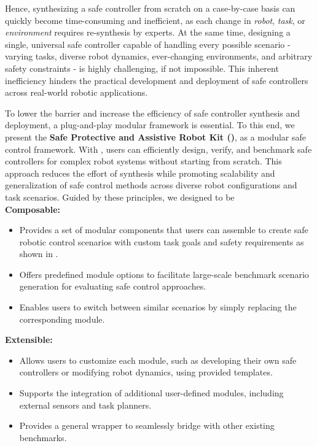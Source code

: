 Hence, synthesizing a safe controller from scratch on a case-by-case basis can quickly become time-consuming and inefficient, as each change in \textit{robot}, \textit{task}, or \textit{environment} requires re-synthesis by experts. 
At the same time, designing a single, universal safe controller capable of handling every possible scenario - varying tasks, diverse robot dynamics, ever-changing environments, and arbitrary safety constraints - is highly challenging, if not impossible. 
This inherent inefficiency hinders the practical development and deployment of safe controllers across real-world robotic applications.

To lower the barrier and increase the efficiency of safe controller synthesis and deployment, a plug-and-play modular framework is essential. 
To this end, we present the \textbf{Safe Protective and Assistive Robot Kit (\spark)}, as a modular safe control framework. 
With \spark, users can efficiently design, verify, and benchmark safe controllers for complex robot systems without starting from scratch. 
This approach reduces the effort of synthesis while promoting scalability and generalization of safe control methods across diverse robot configurations and task scenarios.
Guided by these principles, we designed \spark to be
\\
\noindent\textbf{Composable:}
\begin{itemize}
    \item Provides a set of modular components that users can assemble to create safe robotic control scenarios with custom task goals and safety requirements as shown in .
    \item Offers predefined module options to facilitate large-scale benchmark scenario generation for evaluating safe control approaches.
    \item Enables users to switch between similar scenarios by simply replacing the corresponding module.
\end{itemize}
\noindent\textbf{Extensible:}
\begin{itemize}
    \item Allows users to customize each module, such as developing their own safe controllers or modifying robot dynamics, using provided templates.
    \item Supports the integration of additional user-defined modules, including external sensors and task planners.
    \item Provides a general wrapper to seamlessly bridge \spark with other existing benchmarks.
\end{itemize}
